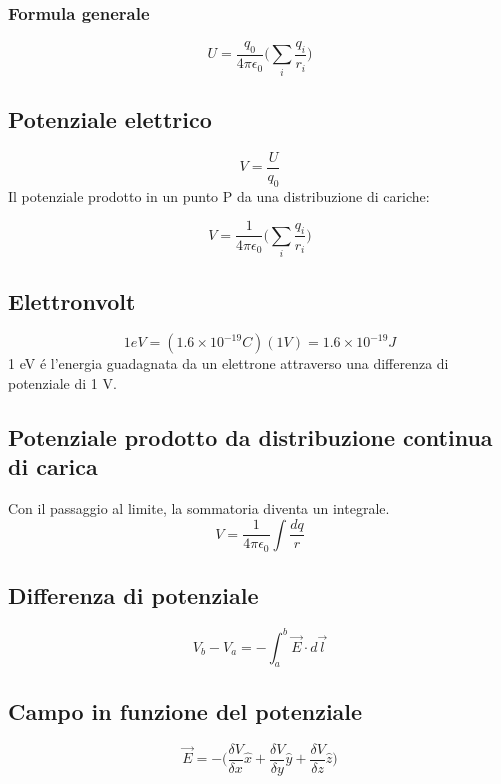\subsubsection{Formula generale}
\begin{equation}
    U = \frac{q_0}{4\pi\epsilon_0}\Bigg(\sum_i\frac{q_i}{r_i}\Bigg)
\end{equation}

\subsection{Potenziale elettrico}
\begin{equation}
    V = \frac{U}{q_0}
\end{equation}
Il potenziale prodotto in un punto P da una distribuzione di cariche:

\begin{equation}
    V = \frac{1}{4\pi\epsilon_0}\Bigg(\sum_i\frac{q_i}{r_i}\Bigg)
\end{equation}

\subsection{Elettronvolt}
\begin{equation*}
    1eV = (1.6 \times 10^{-19}C)(1V) = 1.6\times 10^{-19}J
\end{equation*}
1 eV é l'energia guadagnata da un elettrone attraverso una differenza
di potenziale di 1 V.

\subsection{Potenziale prodotto da distribuzione continua di carica}
Con il passaggio al limite, la sommatoria diventa un integrale.
\begin{equation}
    V = \frac{1}{4\pi\epsilon_0}\int\frac{dq}{r}
\end{equation}

\subsection{Differenza di potenziale}
\begin{equation}
    V_b - V_a = -\int_a^b{\vec{E}\cdot d\vec{l}}
\end{equation}

\subsection{Campo in funzione del potenziale}
\begin{equation}
    \vec{E} =
    - \Bigg(
        \frac{\delta V}{\delta x}\hat{x} +
        \frac{\delta V}{\delta y}\hat{y} +
        \frac{\delta V}{\delta z}\hat{z}
    \Bigg)
\end{equation}


